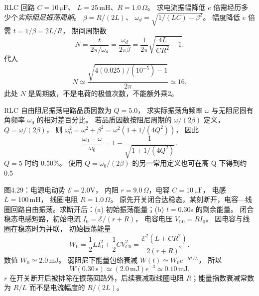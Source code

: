 RLC 回路 $C=10\,\mathrm{\mu F}$、
$L=25\,\mathrm{mH}$、$R=1.0\,\Omega$。
求电流振幅降低 $e$ 倍需经历多少个\emph{实际阻尼振荡周期}。
\exsolution
$\beta=R/(2L)$、
$\omega_d=\sqrt{1/(LC)-\beta^2}$。
幅度降低 $e$ 倍需 $t=1/\beta=2L/R$，
期间周期数
\[
N=\frac t{2\pi/\omega_d}
=\frac{\omega_d}{2\pi\beta}
=\frac1{2\pi}\sqrt{\frac{4L}{CR^2}-1}.
\]
代入
\[
\boxed{N\simeq
\frac{\sqrt{4(0.025)/(10^{-5})-1}}{2\pi}
\simeq16}.
\]
\excheck 此处 $N$ 是周期数，不是电荷的极值次数，不能额外乘2。

RLC 自由阻尼振荡电路品质因数为 $Q=5.0$，
求实际振荡角频率 $\omega$ 与无阻尼固有角频率 $\omega_0$ 的相对差百分比。
\exsolution
若品质因数按阻尼周期的 $\omega/(2\beta)$ 定义，
$Q=\omega/(2\beta)$，
则
$\omega_0^2=\omega^2+\beta^2
=\omega^2(1+1/(4Q^2))$，
因此
\[
\boxed{\frac{\omega_0-\omega}{\omega_0}
=1-\frac1{\sqrt{1+1/(4Q^2)}}}.
\]
$Q=5$ 时约
$\boxed{0.50\%}$。
\excheck 使用 $Q=\omega_0/(2\beta)$ 的另一常用定义也可在高 Q 下得到约0.5%

图4.29：电源电动势 $\mathcal E=2.0$V，
内阻 $r=9.0\,\Omega$，电容
$C=10\,\mathrm{\mu F}$，
电感 $L=100\,\mathrm{mH}$，
线圈电阻 $R=1.0\,\Omega$。
原先开关闭合达稳态，某刻断开，电容—线圈回路自由振荡。求断开后：(a) 初始振荡能量；(b) $t=0.30$s 的剩余能量。
\exsolution
闭合稳态电感短路，初始电流
$I_0=\mathcal E/(r+R)$，
电容电压 $V_{C0}=RI_0$。
因电容与线圈在稳态时为并联，
初始振荡能量
\[
W_0=\frac12LI_0^2+\frac12CV_{C0}^2
=\frac{\mathcal E^2(L+CR^2)}{2(r+R)^2}.
\]
数值
$\boxed{W_0\simeq2.0\,\mathrm{mJ}}$。
弱阻尼下能量包络衰减
$W(t)\simeq W_0e^{-Rt/L}$，
所以
\[
\boxed{W(0.30\,\mathrm s)\simeq
(2.0\,\mathrm{mJ})e^{-3}
\simeq0.10\,\mathrm{mJ}}.
\]
\excheck $r$ 在开关断开后被排除在振荡回路外，后续衰减取线圈电阻 $R$；能量指数衰减常数为 $R/L$ 而不是电流幅度的 $R/(2L)$。
